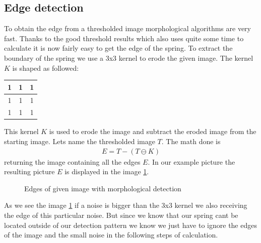 \subsection{Edge detection}   
To obtain the edge from a thresholded image morphological algorithms are very fast. Thanks to the good threshold results which also uses quite some time to calculate it is now fairly easy to get the edge of the spring. To extract the boundary of the spring we use a 3x3 kernel to erode the given image. The kernel $K$ is shaped as followed:
\begin{center}
\setlength{\tabcolsep}{0.5em} %
{\renewcommand{\arraystretch}{1.2}
\begin{tabular}{|c|c|c|}
	\hline
	1&1&1\\
	\hline
	1&1&1\\
	\hline
	1&1&1\\
	\hline
\end{tabular}
}
\end{center}

This kernel $K$ is used to erode the image and subtract the eroded image from the starting image. Lets name the thresholded image $T$. The math done is 
\begin{align*}
 E = T-(T\ominus K)
\end{align*}
returning the image containing all the edges $E$. In our example picture the resulting picture $E$ is displayed in the image \ref{development:edge}.\\



\begin{figure}[!h]
	\centering
	\caption{Edges of given image with morphological detection}
	\label{development:edge}
\end{figure}
As we see the image \ref{development:edge} if a noise is bigger than the 3x3 kernel we also receiving the edge of this particular noise. But since we know that our spring cant be located outside of our detection pattern we know we just have to ignore the edges of the image and the small noise in the following steps of calculation.  
\newpage